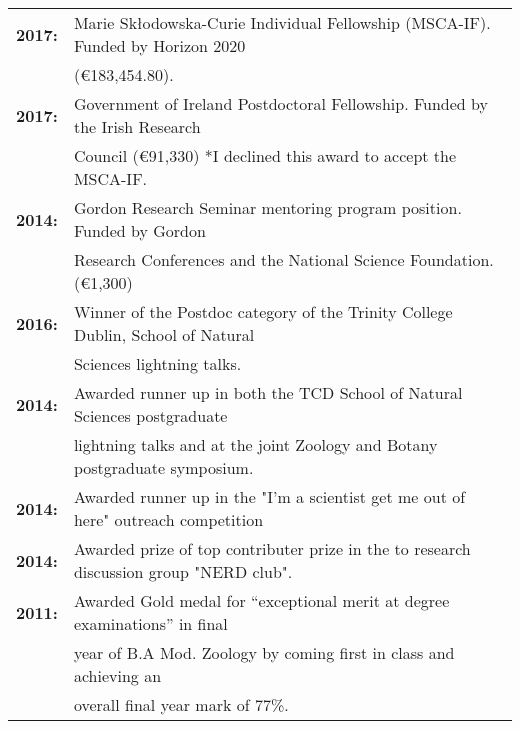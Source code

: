 \documentclass[10pt,a4paper]{article}
\begin{document}
\begin{tabular}{ll}
\textbf{2017:} & Marie Sk\l{}odowska-Curie Individual Fellowship (MSCA-IF). Funded by Horizon 2020\\
& (\euro 183,454.80).\\
\textbf{2017:} & Government of Ireland Postdoctoral Fellowship. Funded by the Irish Research\\
& Council (\euro 91,330) *I declined this award to accept the MSCA-IF.\\
\textbf{2014:} & Gordon Research Seminar mentoring program position. Funded by Gordon\\
& Research Conferences and the National Science Foundation. (\euro 1,300)\\
\textbf{2016:} & Winner of the Postdoc category of the Trinity College Dublin, School of Natural\\
& Sciences lightning talks.\\
\textbf{2014:} & Awarded runner up in both the TCD School of Natural Sciences postgraduate\\
& lightning talks and at the joint Zoology and Botany postgraduate symposium.\\
\textbf{2014:} & Awarded runner up in the "I'm a scientist get me out of here" outreach competition\\
\textbf{2014:} & Awarded prize of top contributer prize in the to research discussion group "NERD club".\\
\textbf{2011:} & Awarded Gold medal for “exceptional merit at degree examinations” in final\\
& year of B.A Mod. Zoology by coming first in class and achieving an\\
& overall final year mark of 77\%.\\
\end{tabular}

\bigskip


\end{document}
